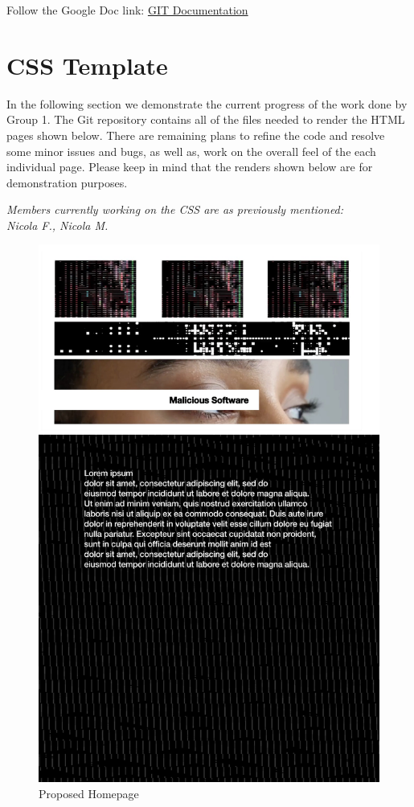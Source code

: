 \documentclass[a4paper,10pt]{article}
\begin{document}
 Follow the Google Doc link: \href{https://docs.google.com/document/d/1xm-WyAb7C8v4JPY7QxbT4x-r0_QLRMDOoNHiNFWnwEI/edit?usp=drivesdk}{GIT Documentation}

\section{CSS Template}
In the following section we demonstrate the current progress of the work done by Group 1. The Git repository contains all of the files needed to render the HTML pages shown below. There are remaining plans to refine the code and resolve some minor issues and bugs, as well as, work on the overall feel of the each individual page. Please keep in mind that the renders shown below are for demonstration purposes.
\begin{center} 
{\textit{Members currently working on the CSS are as previously mentioned:\\
Nicola F., Nicola M. }}
\end{center}

\begin{figure}[p]
\includegraphics[height=0.52\paperheight, center]{homepage_page.jpeg}
\caption{Proposed Homepage}
\end{figure}
\end{document}
